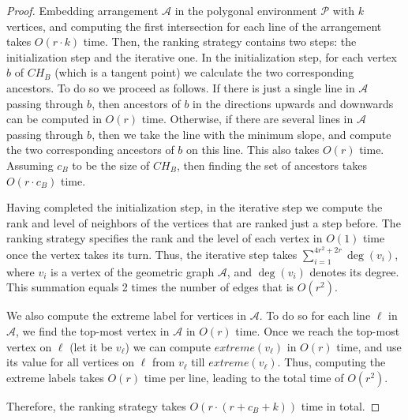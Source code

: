 \documentclass[a4paper,UKenglish]{lipics-v2018}
\theoremstyle{definition}
\begin{document}
\begin{proof}
Embedding arrangement $\mathcal A$ in the polygonal environment $\mathcal P$ with $k$ vertices, and computing the first intersection for each line of the arrangement takes $O(r \cdot k)$ time.
Then, the ranking strategy contains two steps: the initialization step and the iterative one.
In the initialization step, for each vertex $b$ of $CH_B$ (which is a tangent point) we calculate  the two  corresponding ancestors. To do so we proceed as follows. If there is just a single line in $\mathcal A$ passing through $b$, then ancestors of $b$ in the directions upwards and downwards can be computed in $O(r)$ time. Otherwise, if there are several lines in $\mathcal A$ passing through $b$, then we take the line with the minimum slope, and compute the two corresponding ancestors of $b$ on this line. This also takes $O(r)$ time. Assuming $c_B$ to be the size of $CH_B$, then finding the set of ancestors takes  $O(r \cdot c_B)$ time.

Having completed the initialization step, in the iterative step we compute the rank and level of neighbors of the vertices that are ranked just a step before. The ranking strategy specifies the rank and the level of each vertex in $O(1)$ time once the vertex takes its turn. Thus, the iterative step takes $\sum_{i=1}^{4r^2+2r} \deg(v_i)$, where $v_i$ is a vertex of the geometric graph $\mathcal A$, and $\deg(v_i)$ denotes its degree. This summation equals 2 times the number of edges that is $O(r^2)$.

We also compute the extreme label for vertices in $\mathcal A$. To do so
for each line $\ell$ in $\mathcal A$, we find the top-most vertex in $\mathcal A$ in $O(r)$ time. Once  we reach the top-most vertex on $\ell$ (let it be $v_\ell$) we can compute $extreme(v_\ell)$ in $O(r)$ time, and use its value for all vertices on $\ell$ from $v_\ell$ till $extreme(v_\ell)$. Thus, computing the extreme labels takes $O(r)$ time per line, leading to the total time of $O(r^2)$.

Therefore, the ranking strategy takes $O(r \cdot (r+c_B+k))$ time in total.
\end{proof}
\end{document}
